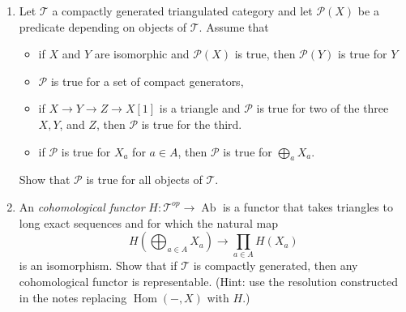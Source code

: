 \documentclass[12pt]{amsart}
\begin{document}
\begin{enumerate}
    \item Let $\mathcal T$ a compactly generated triangulated category and let $\mathcal P(X)$ be a predicate depending on objects of $\mathcal T$. Assume that
    \begin{itemize}
        \item if $X$ and $Y$ are isomorphic and $\mathcal P(X)$ is true, then $\mathcal P(Y)$ is true for $Y$
        \item $\mathcal P$ is true for a set of compact generators, 
        \item if $X \to Y \to Z \to X[1]$ is a triangle and $\mathcal P$ is true for two of the three $X,Y$, and $Z$, then $\mathcal P$ is true for the third. 
        \item if $\mathcal P$ is true for $X_a$ for $a \in A$, then $\mathcal P$ is true for $\bigoplus_a X_a$. 
    \end{itemize}
    Show that $\mathcal P$ is true for all objects of $\mathcal T$. 

    \item An {\em cohomological functor} $H: \mathcal T^{op} \to \operatorname{Ab}$ is a functor that takes triangles to long exact sequences and for which the natural map 
    \begin{displaymath}
        H\left( \bigoplus_{a \in A} X_a \right) \to \prod_{a \in A} H(X_a)
    \end{displaymath}
    is an isomorphism. Show that if $\mathcal T$ is compactly generated, then any cohomological functor is representable. (Hint: use the resolution constructed in the notes replacing $\operatorname{Hom}(-,X)$ with $H$.)

\end{enumerate}
\end{document}

